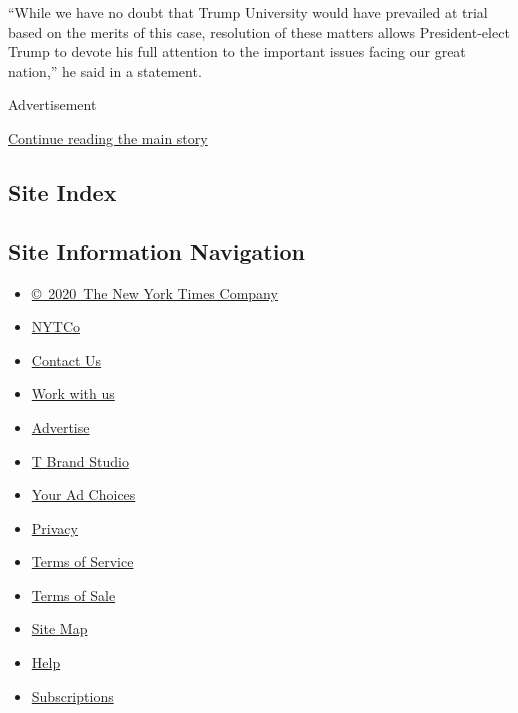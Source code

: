 ``While we have no doubt that Trump University would have prevailed at
trial based on the merits of this case, resolution of these matters
allows President-elect Trump to devote his full attention to the
important issues facing our great nation,'' he said in a statement.

Advertisement

\protect\hyperlink{after-bottom}{Continue reading the main story}

\hypertarget{site-index}{%
\subsection{Site Index}\label{site-index}}

\hypertarget{site-information-navigation}{%
\subsection{Site Information
Navigation}\label{site-information-navigation}}

\begin{itemize}
\tightlist
\item
  \href{https://help.nytimes.com/hc/en-us/articles/115014792127-Copyright-notice}{©~2020~The
  New York Times Company}
\end{itemize}

\begin{itemize}
\tightlist
\item
  \href{https://www.nytco.com/}{NYTCo}
\item
  \href{https://help.nytimes.com/hc/en-us/articles/115015385887-Contact-Us}{Contact
  Us}
\item
  \href{https://www.nytco.com/careers/}{Work with us}
\item
  \href{https://nytmediakit.com/}{Advertise}
\item
  \href{http://www.tbrandstudio.com/}{T Brand Studio}
\item
  \href{https://www.nytimes.com/privacy/cookie-policy\#how-do-i-manage-trackers}{Your
  Ad Choices}
\item
  \href{https://www.nytimes.com/privacy}{Privacy}
\item
  \href{https://help.nytimes.com/hc/en-us/articles/115014893428-Terms-of-service}{Terms
  of Service}
\item
  \href{https://help.nytimes.com/hc/en-us/articles/115014893968-Terms-of-sale}{Terms
  of Sale}
\item
  \href{https://spiderbites.nytimes.com}{Site Map}
\item
  \href{https://help.nytimes.com/hc/en-us}{Help}
\item
  \href{https://www.nytimes.com/subscription?campaignId=37WXW}{Subscriptions}
\end{itemize}
